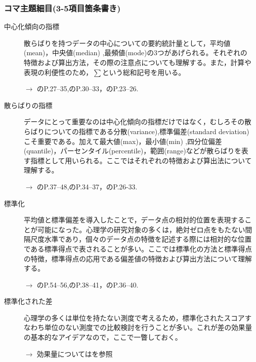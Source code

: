 \subsubsection{コマ主題細目(3-5項目箇条書き)}
\begin{description}
	\item[中心化傾向の指標] 散らばりを持つデータの中心についての要約統計量として，平均値(mean)，中央値(median) ,最頻値(mode)の3つがあげられる。それぞれの特徴および算出方法，その際の注意点についても理解する。また，計算や表現の利便性のため，$\sum$という総和記号を用いる。
	      \begin{flushright}
		      $\to$ \citet{Yamauchi201001}のP.27--35,\citet{Yamada2004}のP.30--33，\citet{Kawabata201408}のP.23--26.
	      \end{flushright}

	\item[散らばりの指標] データにとって重要なのは中心化傾向の指標だけではなく，むしろその散らばりについての指標である分散(variance),標準偏差(standard deviation)こそ重要である。加えて最大値(max)，最小値(min) ,四分位偏差(quantile)，パーセンタイル(percentile)，範囲(range)などが散らばりを表す指標として用いられる。ここではそれぞれの特徴および算出法について理解する。
	      \begin{flushright}
		      $\to$ \citet{Yamauchi201001}のP.37--48,\citet{Yamada2004}のP.34--37，\citet{Kawabata201408}のP.26-33.
	      \end{flushright}

	\item[標準化]平均値と標準偏差を導入したことで，データ点の相対的位置を表現することが可能になった。心理学の研究対象の多くは，絶対ゼロ点をもたない間隔尺度水準であり，個々のデータ点の特徴を記述する際には相対的な位置である標準得点で表されることが多い。ここでは標準化の方法と標準得点の特徴，標準得点の応用である偏差値の特徴および算出方法について理解する。
	      \begin{flushright}
		      $\to$ \citet{Yamauchi201001}のP.54--56,\citet{Yamada2004}のP.38--41，\citet{Kawabata201408}のP.36--40.
	      \end{flushright}

	\item[標準化された差]心理学の多くは単位を持たない測度で考えるため，標準化されたスコアすなわち単位のない測度での比較検討を行うことが多い。これが差の効果量の基本的なアイデアなので，ここで一瞥しておく。

	      \begin{flushright}
		      $\to$ 効果量については\citet{Matia201201}を参照
	      \end{flushright}


\end{description}
